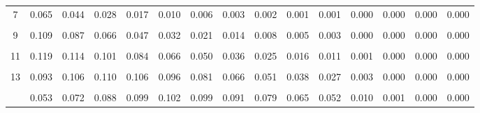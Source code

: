 \documentclass[
]{article}
\begin{document}
\begin{table}[!h]
{\begin{tabular}[t]{ccccccccccccccc}
7 & 0.065 & 0.044 & 0.028 & 0.017 & 0.010 & 0.006 & 0.003 & 0.002 & 0.001 & 0.001 & 0.000 & 0.000 & 0.000 & 0.000\\
\cellcolor{gray!10}{8} & \cellcolor{gray!10}{0.089} & \cellcolor{gray!10}{0.066} & \cellcolor{gray!10}{0.046} & \cellcolor{gray!10}{0.030} & \cellcolor{gray!10}{0.019} & \cellcolor{gray!10}{0.012} & \cellcolor{gray!10}{0.007} & \cellcolor{gray!10}{0.004} & \cellcolor{gray!10}{0.002} & \cellcolor{gray!10}{0.001} & \cellcolor{gray!10}{0.000} & \cellcolor{gray!10}{0.000} & \cellcolor{gray!10}{0.000} & \cellcolor{gray!10}{0.000}\\
9 & 0.109 & 0.087 & 0.066 & 0.047 & 0.032 & 0.021 & 0.014 & 0.008 & 0.005 & 0.003 & 0.000 & 0.000 & 0.000 & 0.000\\
\addlinespace
\cellcolor{gray!10}{10} & \cellcolor{gray!10}{0.119} & \cellcolor{gray!10}{0.105} & \cellcolor{gray!10}{0.086} & \cellcolor{gray!10}{0.066} & \cellcolor{gray!10}{0.049} & \cellcolor{gray!10}{0.034} & \cellcolor{gray!10}{0.023} & \cellcolor{gray!10}{0.015} & \cellcolor{gray!10}{0.009} & \cellcolor{gray!10}{0.006} & \cellcolor{gray!10}{0.000} & \cellcolor{gray!10}{0.000} & \cellcolor{gray!10}{0.000} & \cellcolor{gray!10}{0.000}\\
11 & 0.119 & 0.114 & 0.101 & 0.084 & 0.066 & 0.050 & 0.036 & 0.025 & 0.016 & 0.011 & 0.001 & 0.000 & 0.000 & 0.000\\
\cellcolor{gray!10}{12} & \cellcolor{gray!10}{0.109} & \cellcolor{gray!10}{0.114} & \cellcolor{gray!10}{0.110} & \cellcolor{gray!10}{0.098} & \cellcolor{gray!10}{0.083} & \cellcolor{gray!10}{0.066} & \cellcolor{gray!10}{0.050} & \cellcolor{gray!10}{0.037} & \cellcolor{gray!10}{0.026} & \cellcolor{gray!10}{0.018} & \cellcolor{gray!10}{0.002} & \cellcolor{gray!10}{0.000} & \cellcolor{gray!10}{0.000} & \cellcolor{gray!10}{0.000}\\
13 & 0.093 & 0.106 & 0.110 & 0.106 & 0.096 & 0.081 & 0.066 & 0.051 & 0.038 & 0.027 & 0.003 & 0.000 & 0.000 & 0.000\\
\cellcolor{gray!10}{14} & \cellcolor{gray!10}{0.073} & \cellcolor{gray!10}{0.090} & \cellcolor{gray!10}{0.102} & \cellcolor{gray!10}{0.106} & \cellcolor{gray!10}{0.102} & \cellcolor{gray!10}{0.093} & \cellcolor{gray!10}{0.080} & \cellcolor{gray!10}{0.065} & \cellcolor{gray!10}{0.051} & \cellcolor{gray!10}{0.039} & \cellcolor{gray!10}{0.006} & \cellcolor{gray!10}{0.001} & \cellcolor{gray!10}{0.000} & \cellcolor{gray!10}{0.000}\\
\addlinespace
15 & 0.053 & 0.072 & 0.088 & 0.099 & 0.102 & 0.099 & 0.091 & 0.079 & 0.065 & 0.052 & 0.010 & 0.001 & 0.000 & 0.000\\

\end{tabular}}
\end{table}
\end{document}
